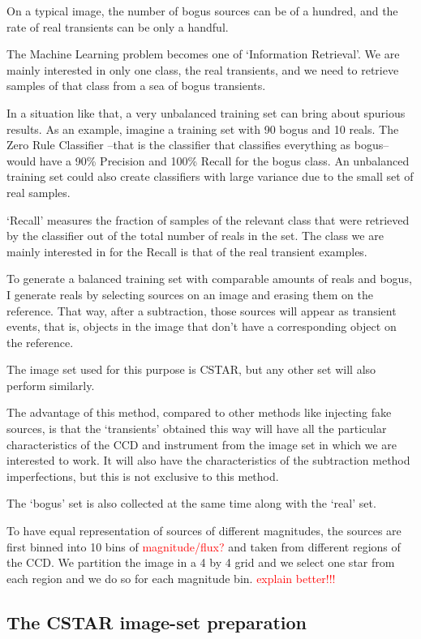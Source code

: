 On a typical image, the number of bogus sources can be of a hundred, and the rate of real transients can be only a handful. 

The Machine Learning problem becomes one of `Information Retrieval'. We are mainly interested in only one class, the real transients, and we need to retrieve samples of that class from a sea of bogus transients.

In a situation like that, a very unbalanced training set can bring about spurious results. As an example, imagine a training set with 90 bogus and 10 reals. The Zero Rule Classifier --that is the classifier that classifies everything as bogus-- would have a 90\% Precision and 100\% Recall for the bogus class. An unbalanced training set could also create classifiers with large variance due to the small set of real samples.

`Recall' measures the fraction of samples of the relevant class that were retrieved by the classifier out of the total number of reals in the set.
The class we are mainly interested in for the Recall is that of the real transient examples.

To generate a balanced training set with comparable amounts of reals and bogus, I generate reals by selecting sources on an image and erasing them on the reference. That way, after a subtraction, those sources will appear as transient events, that is, objects in the image that don't have a corresponding object on the reference.

The image set used for this purpose is CSTAR, but any other set will also perform similarly.

The advantage of this method, compared to other methods like injecting fake sources, is that the `transients' obtained this way will have all the particular characteristics of the CCD and instrument from the image set in which we are interested to work. It will also have the characteristics of the subtraction method imperfections, but this is not exclusive to this method.

The `bogus' set is also collected at the same time along with the `real' set.

To have equal representation of sources of different magnitudes, the sources are first binned into 10 bins of \textcolor{red}{magnitude/flux?} and taken from different regions of the CCD.
We partition the image in a 4 by 4 grid and we select one star from each region and we do so for each magnitude bin. \textcolor{red}{explain better!!!}

\subsection{The CSTAR image-set preparation}

